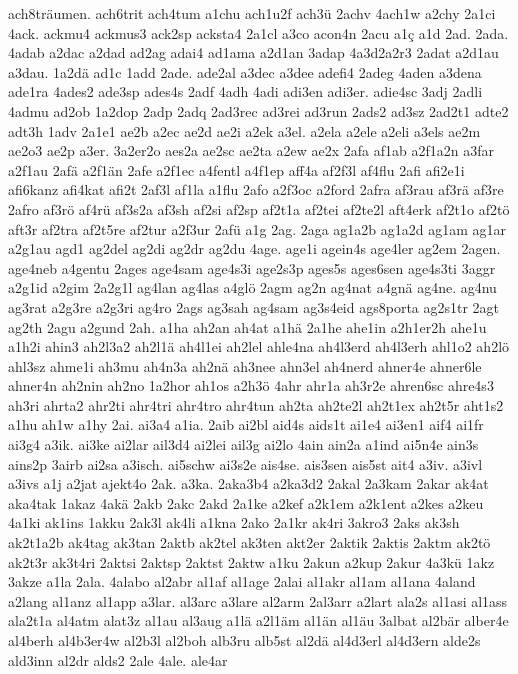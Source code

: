 {ach8träumen.
ach6trit
ach4tum
a1chu
ach1u2f
ach3ü
2achv
4ach1w
a2chy
2a1ci
4ack.
ackmu4
ackmus3
ack2sp
acksta4
2a1cl
a3co
acon4n
2acu
a1ç
a1d
2ad.
2ada.
4adab
a2dac
a2dad
ad2ag
adai4
ad1ama
a2d1an
3adap
4a3d2a2r3
2adat
a2d1au
a3dau.
1a2dä
ad1c
1add
2ade.
ade2al
a3dec
a3dee
adefi4
2adeg
4aden
a3dena
ade1ra
4ades2
ade3sp
ades4s
2adf
4adh
4adi
adi3en
adi3er.
adie4sc
3adj
2adli
4admu
ad2ob
1a2dop
2adp
2adq
2ad3rec
ad3rei
ad3run
2ads2
ad3sz
2ad2t1
adte2
adt3h
1adv
2a1e1
ae2b
a2ec
ae2d
ae2i
a2ek
a3el.
a2ela
a2ele
a2eli
a3els
ae2m
ae2o3
ae2p
a3er.
3a2er2o
aes2a
ae2sc
ae2ta
a2ew
ae2x
2afa
af1ab
a2f1a2n
a3far
a2f1au
2afä
a2f1än
2afe
a2f1ec
a4fentl
a4f1ep
aff4a
af2f3l
af4flu
2afi
afi2e1i
afi6kanz
afi4kat
afi2t
2af3l
af1la
a1flu
2afo
a2f3oc
a2ford
2afra
af3rau
af3rä
af3re
2afro
af3rö
af4rü
af3s2a
af3sh
af2si
af2sp
af2t1a
af2tei
af2te2l
aft4erk
af2t1o
af2tö
aft3r
af2tra
af2t5re
af2tur
a2f3ur
2afü
a1g
2ag.
2aga
ag1a2b
ag1a2d
ag1am
ag1ar
a2g1au
agd1
ag2del
ag2di
ag2dr
ag2du
4age.
age1i
agein4s
age4ler
ag2em
2agen.
age4neb
a4gentu
2ages
age4sam
age4s3i
age2s3p
ages5s
ages6sen
age4s3ti
3aggr
a2g1id
a2gim
2a2g1l
ag4lan
ag4las
a4glö
2agm
ag2n
ag4nat
a4gnä
ag4ne.
ag4nu
ag3rat
a2g3re
a2g3ri
ag4ro
2ags
ag3sah
ag4sam
ag3s4eid
ags8porta
ag2s1tr
2agt
ag2th
2agu
a2gund
2ah.
a1ha
ah2an
ah4at
a1hä
2a1he
ahe1in
a2h1er2h
ahe1u
a1h2i
ahin3
ah2l3a2
ah2l1ä
ah4l1ei
ah2lel
ahle4na
ah4l3erd
ah4l3erh
ahl1o2
ah2lö
ahl3sz
ahme1i
ah3mu
ah4n3a
ah2nä
ah3nee
ahn3el
ah4nerd
ahner4e
ahner6le
ahner4n
ah2nin
ah2no
1a2hor
ah1os
a2h3ö
4ahr
ahr1a
ah3r2e
ahren6sc
ahre4s3
ah3ri
ahrta2
ahr2ti
ahr4tri
ahr4tro
ahr4tun
ah2ta
ah2te2l
ah2t1ex
ah2t5r
aht1s2
a1hu
ah1w
a1hy
2ai.
ai3a4
a1ia.
2aib
ai2bl
aid4s
aids1t
ai1e4
ai3en1
aif4
ai1fr
ai3g4
a3ik.
ai3ke
ai2lar
ail3d4
ai2lei
ail3g
ai2lo
4ain
ain2a
a1ind
ai5n4e
ain3s
ains2p
3airb
ai2sa
a3isch.
ai5schw
ai3s2e
ais4se.
ais3sen
ais5st
ait4
a3iv.
a3ivl
a3ivs
a1j
a2jat
ajekt4o
2ak.
a3ka.
2aka3b4
a2ka3d2
2akal
2a3kam
2akar
ak4at
aka4tak
1akaz
4akä
2akb
2akc
2akd
2a1ke
a2kef
a2k1em
a2k1ent
a2kes
a2keu
4a1ki
ak1ins
1akku
2ak3l
ak4li
a1kna
2ako
2a1kr
ak4ri
3akro3
2aks
ak3sh
ak2t1a2b
ak4tag
ak3tan
2aktb
ak2tel
ak3ten
akt2er
2aktik
2aktis
2aktm
ak2tö
ak2t3r
ak3t4ri
2aktsi
2aktsp
2aktst
2aktw
a1ku
2akun
a2kup
2akur
4a3kü
1akz
3akze
a1la
2ala.
4alabo
al2abr
al1af
al1age
2alai
al1akr
al1am
al1ana
4aland
a2lang
al1anz
al1app
a3lar.
al3arc
a3lare
al2arm
2al3arr
a2lart
ala2s
al1asi
al1ass
ala2t1a
al4atm
alat3z
al1au
al3aug
a1lä
a2l1äm
al1än
al1äu
3albat
al2bär
alber4e
al4berh
al4b3er4w
al2b3l
al2boh
alb3ru
alb5st
al2dä
al4d3erl
al4d3ern
alde2s
ald3inn
al2dr
alds2
2ale
4ale.
ale4ar
}
